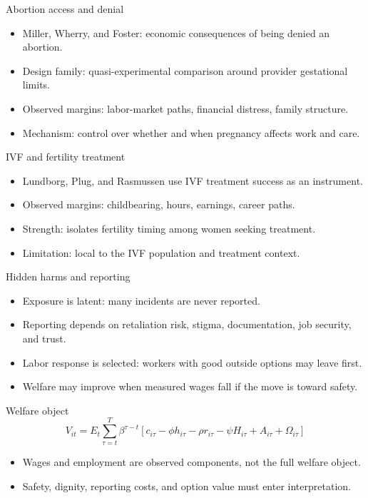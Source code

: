 \documentclass[aspectratio=169,11pt]{beamer}
\begin{document}
\begin{frame}{Abortion access and denial}
\begin{itemize}
    \item Miller, Wherry, and Foster: economic consequences of being denied an abortion.
    \item Design family: quasi-experimental comparison around provider gestational limits.
    \item Observed margins: labor-market paths, financial distress, family structure.
    \item Mechanism: control over whether and when pregnancy affects work and care.
\end{itemize}
\end{frame}

\begin{frame}{IVF and fertility treatment}
\begin{itemize}
    \item Lundborg, Plug, and Rasmussen use IVF treatment success as an instrument.
    \item Observed margins: childbearing, hours, earnings, career paths.
    \item Strength: isolates fertility timing among women seeking treatment.
    \item Limitation: local to the IVF population and treatment context.
\end{itemize}
\end{frame}

\begin{frame}{Hidden harms and reporting}
\begin{itemize}
    \item Exposure is latent: many incidents are never reported.
    \item Reporting depends on retaliation risk, stigma, documentation, job security, and trust.
    \item Labor response is selected: workers with good outside options may leave first.
    \item Welfare may improve when measured wages fall if the move is toward safety.
\end{itemize}
\end{frame}

\begin{frame}{Welfare object}
\[
V_{it}=E_t\sum_{\tau=t}^{T}\beta^{\tau-t}
\left[
c_{i\tau}
-\phi h_{i\tau}
-\rho r_{i\tau}
-\psi H_{i\tau}
+A_{i\tau}
+\Omega_{i\tau}
\right]
\]
\begin{itemize}
    \item Wages and employment are observed components, not the full welfare object.
    \item Safety, dignity, reporting costs, and option value must enter interpretation.
\end{itemize}
\end{frame}
\end{document}
